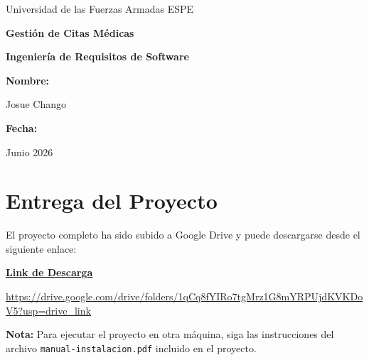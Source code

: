 \documentclass[12pt,a4paper]{article}
\begin{document}
\begin{titlepage}
    \centering
    \vspace*{2cm}

    {\LARGE Universidad de las Fuerzas Armadas ESPE\par}

    \vspace{1.5cm}

    {\Large \textbf{Gestión de Citas Médicas}\par}

    \vspace{1cm}

    {\large \textbf{Ingeniería de Requisitos de Software}\par}

    \vspace{2cm}

    {\large \textbf{Nombre:}}\par
    {\large Josue Chango\par}

    \vspace{0.5cm}

    {\large \textbf{Fecha:}}\par
    {\large Junio 2026\par}

    \vfill
\end{titlepage}

\newpage

\section*{Entrega del Proyecto}

El proyecto completo ha sido subido a Google Drive y puede descargarse desde el siguiente enlace:

\vspace{1cm}

\begin{center}
\Large
\href{https://drive.google.com/drive/folders/1qCq8fYIRo7tgMrz1G8mYRPUjdKVKDoV5?usp=drive_link}
{\textbf{Link de Descarga}}

\vspace{0.3cm}
\url{https://drive.google.com/drive/folders/1qCq8fYIRo7tgMrz1G8mYRPUjdKVKDoV5?usp=drive_link}
\end{center}

\vspace{1cm}

\textbf{Nota:} Para ejecutar el proyecto en otra máquina, siga las instrucciones del archivo \texttt{manual-instalacion.pdf} incluido en el proyecto.
\end{document}
